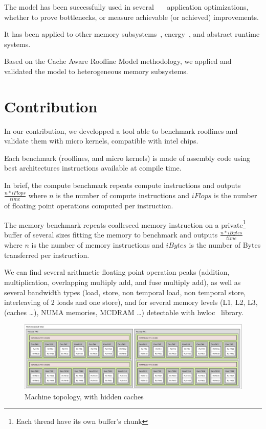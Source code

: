 \documentclass[runningheads,a4paper]{llncs}
\begin{document}
The model has been successfully used in
several~\cite{Kim20111201}~\cite{Rossinelli2164}~\cite{vanNieuwpoort:2009:UMH:1542275.1542337} application optimizations, whether
to prove bottlenecks, or measure achievable (or achieved) improvements.

It has been applied to other memory subsystems~\cite{ilic2014cache}, energy~\cite{7493653}, and abstract runtime systems.

Based on the Cache Aware Roofline Model methodology, we applied and validated the model to heterogeneous memory subsystems.

\section{Contribution}
\label{sec:contrib}

In our contribution, we developped a tool able to benchmark rooflines and validate them with micro kernels, compatible with intel chips.

Each benchmark (rooflines, and micro kernels) is made of assembly code using best architectures instructions available at compile
time.

In brief, the compute benchmark repeats compute instructions and outputs $\frac{n*iFlops}{time}$ where $n$ is the number of compute instructions and $iFlops$ is the number of floating point operations computed per instruction.

The memory benchmark repeats coallesced memory instruction on a private\footnote{Each thread have its own buffer's chunk} buffer of several sizes fitting the memory to benchmark and outputs $\frac{n*iBytes}{time}$ where $n$ is the number of memory instructions and $iBytes$ is the number of Bytes transferred per instruction.

We can find several arithmetic floating point operation peaks (addition, multiplication, overlapping multiply add, and fuse
multiply add), as well as several bandwidth types (load, store, non temporal load, non temporal store, interleaving of 2 loads and one store), and for several memory levels (L1, L2, L3, (caches \dots), NUMA memories, MCDRAM \dots) detectable with hwloc~\cite{6903671} library.

\begin{figure}
  \centering
  \includegraphics[width=\textwidth]{pictures/Xeon_E5_2650L_v4}
  \caption{Machine topology, with hidden caches}
  \label{fig:joe0}
\end{figure}
\end{document}
